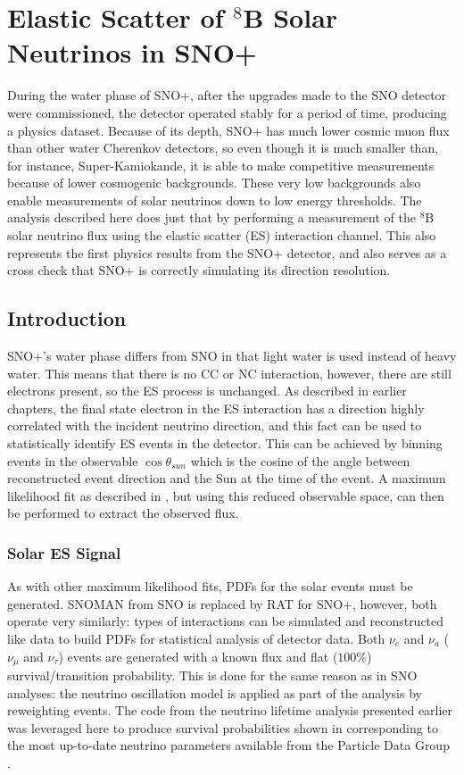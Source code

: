\chapter{Elastic Scatter of $^8$B Solar Neutrinos in SNO+}
\label{ch:es}

During the water phase of SNO+, after the upgrades made to the SNO detector were commissioned, the detector operated stably for a period of time, producing a physics dataset.
Because of its depth, SNO+ has much lower cosmic muon flux than other water Cherenkov detectors, so even though it is much smaller than, for instance, Super-Kamiokande, it is able to make competitive measurements because of lower cosmogenic backgrounds.
These very low backgrounds also enable measurements of solar neutrinos down to low energy thresholds.
The analysis described here does just that by performing a measurement of the $^8$B solar neutrino flux using the elastic scatter (ES) interaction channel.
This also represents the first physics results from the SNO+ detector, and also serves as a cross check that SNO+ is correctly simulating its direction resolution.

\section{Introduction}
\label{sec:solar:intro}

SNO+'s water phase differs from SNO in that light water is used instead of heavy water.
This means that there is no CC or NC interaction, however, there are still electrons present, so the ES process is unchanged.
As described in earlier chapters, the final state electron in the ES interaction has a direction highly correlated with the incident neutrino direction, and this fact can be used to statistically identify ES events in the detector.
This can be achieved by binning events in the observable $\cos{\theta_{sun}}$ which is the cosine of the angle between reconstructed event direction and the Sun at the time of the event.
A maximum likelihood fit as described in , but using this reduced observable space, can then be performed to extract the observed flux.

\subsection{Solar ES Signal}
\label{sec:solar:inputs}

As with other maximum likelihood fits, PDFs for the solar events must be generated.
SNOMAN from SNO is replaced by RAT for SNO+, however, both operate very similarly: types of interactions can be simulated and reconstructed like data to build PDFs for statistical analysis of detector data.
Both $\nu_e$ and $\nu_a$ ($\nu_\mu$ and $\nu_\tau$) events are generated with a known flux and flat ($100\%$) survival/transition probability.
This is done for the same reason as in SNO analyses: the neutrino oscillation model is applied as part of the analysis by reweighting events.
The code from the neutrino lifetime analysis presented earlier was leveraged here to produce survival probabilities shown in  corresponding to the most up-to-date neutrino parameters available from the Particle Data Group \cite{pdg}.

